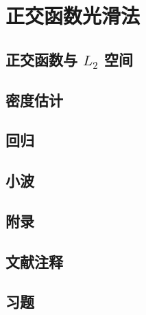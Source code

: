 \chapter{正交函数光滑法}

\section{正交函数与 $L_2$ 空间}

\pending

\section{密度估计}

\pending

\section{回归}

\pending

\section{小波}

\pending

\section{附录}

\pending

\section{文献注释}

\pending

\section{习题}

\pending
